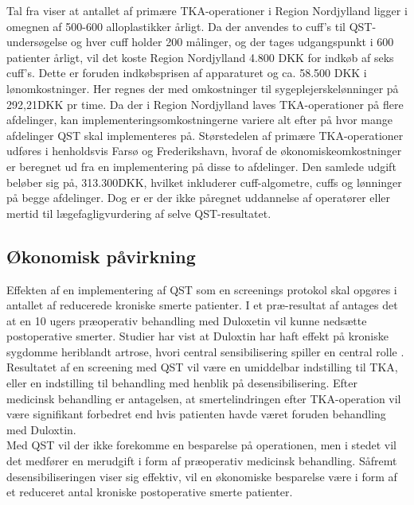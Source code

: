 Tal fra  viser at antallet af primære TKA-operationer i Region Nordjylland ligger i omegnen af 500-600 alloplastikker årligt. Da der anvendes to cuff's til QST-undersøgelse og hver cuff holder 200 målinger, og der tages udgangspunkt i 600 patienter årligt, vil det koste Region Nordjylland 4.800 DKK for indkøb af seks cuff's. Dette er foruden indkøbsprisen af apparaturet og ca. 58.500 DKK i lønomkostninger. Her regnes der med omkostninger til sygeplejerskelønninger på 292,21DKK pr time. \citep{DST1} \citep{DTS2} Da der i Region Nordjylland laves TKA-operationer på flere afdelinger, kan implementeringsomkostningerne variere alt efter på hvor mange afdelinger QST skal implementeres på. Størstedelen af primære TKA-operationer udføres i henholdsvis Farsø og Frederikshavn, hvoraf de økonomiskeomkostninger er beregnet ud fra en implementering på disse to afdelinger. Den samlede udgift beløber sig på, 313.300DKK, hvilket inkluderer cuff-algometre, cuffs og lønninger på begge afdelinger. Dog er er der ikke påregnet uddannelse af operatører eller mertid til lægefagligvurdering af selve QST-resultatet.

\subsection{Økonomisk påvirkning} 
Effekten af en implementering af QST som en screenings protokol skal opgøres i antallet af reducerede kroniske smerte patienter. I et præ-resultat af  antages det at en 10 ugers præoperativ behandling med Duloxetin vil kunne nedsætte postoperative smerter. Studier har vist at Duloxtin har haft effekt på kroniske sygdomme heriblandt artrose, hvori central sensibilisering spiller en central rolle \citep{Blikman2016}. Resultatet af en screening med QST vil være en umiddelbar indstilling til TKA, eller en indstilling til behandling med henblik på desensibilisering. Efter medicinsk behandling er antagelsen, at smertelindringen efter TKA-operation vil være signifikant forbedret end hvis patienten havde været foruden behandling med Duloxtin. \citep{Blikman2016} \\
Med QST vil der ikke forekomme en besparelse på operationen, men i stedet vil det medfører en merudgift i form af præoperativ medicinsk behandling. Såfremt desensibiliseringen viser sig effektiv, vil en økonomiske besparelse være i form af et reduceret antal kroniske postoperative smerte patienter.

